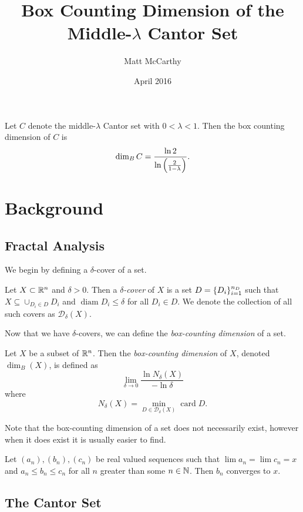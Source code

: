\documentclass[notitlepage]{simple}
\author{Matt McCarthy}
\title{Box Counting Dimension of the Middle-$\lambda$ Cantor Set}
\date{April 2016}
\def\card{\operatorname{card}}
\def\dim{\operatorname{dim}}
\def\diam{\operatorname{diam}}
\begin{document}
	\maketitle

	\begin{thm*}
		Let $C$ denote the middle-$\lambda$ Cantor set with $0 < \lambda < 1$.
		Then the box counting dimension of $C$ is
		\[
			\dim_B C = \frac{\ln 2}{\ln\paren{\frac{2}{1-\lambda}}}.
		\]
	\end{thm*}

	\section{Background}

	\subsection{Fractal Analysis}

	We begin by defining a $\delta$-cover of a set.
	\begin{definition}
		Let $X\subset\mathbb{R}^n$ and $\delta>0$.
		Then a \textit{$\delta$-cover} of $X$ is a set $D=\lbrace D_i \rbrace_{i=1}^{n_D}$ such that $X\subseteq \cup_{D_i\in D} D_i$ and $\diam D_i \leq \delta$ for all $D_i\in D$.
		We denote the collection of all such covers as $\mathcal{D}_\delta(X)$.
	\end{definition}

	Now that we have $\delta$-covers, we can define the \textit{box-counting dimension} of a set.

	\begin{definition}
		Let $X$ be a subset of $\mathbb{R}^n$.
		Then the \textit{box-counting dimension} of $X$, denoted $\dim_B(X)$, is defined as
		\[
			\lim\limits_{\delta\rightarrow0} \frac{\ln N_\delta(X)}{-\ln\delta}
		\]
		where
		\[
			N_\delta(X) = \min\limits_{D\in\mathcal{D}_\delta(X)} \card{D}.
		\]
	\end{definition}
	Note that the box-counting dimension of a set does not necessarily exist, however when it does exist it is usually easier to find.

	\begin{thm}
		Let $(a_n),(b_n),(c_n)$ be real valued sequences such that $\lim a_n = \lim c_n = x$ and $a_n\leq b_n\leq c_n$ for all $n$ greater than some $n\in\mathbb{N}$.
		Then $b_n$ converges to $x$.
	\end{thm}

	\subsection{The Cantor Set}
\end{document}
